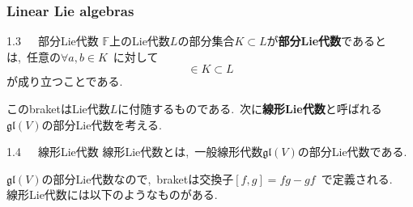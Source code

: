 \documentclass[uplatex,dvipdfmx]{jsarticle}
\begin{document}
\subsubsection{Linear Lie algebras}
\begin{mydef}{1.3~~~部分Lie代数}
    $\mathbb{F}$上のLie代数$L$の部分集合$K\subset L$が\textbf{部分Lie代数}であるとは,~任意の$\forall a,b\in K$~に対して
    \begin{equation*}
        [a,b]\in K\subset L
    \end{equation*}
    が成り立つことである.
\end{mydef}
このbraketはLie代数$L$に付随するものである.~次に\textbf{線形Lie代数}と呼ばれる$\mathfrak{gl}(V)$の部分Lie代数を考える.

\begin{mydef}{1.4~~~線形Lie代数}
    線形Lie代数とは,~一般線形代数$\mathfrak{gl}(V)$の部分Lie代数である.
\end{mydef}
$\mathfrak{gl}(V)$の部分Lie代数なので,~braketは交換子$[f,g]=fg-gf$~で定義される.\\
線形Lie代数には以下のようなものがある.
\end{document}
